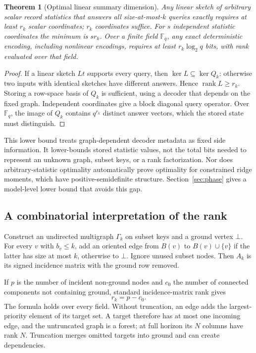 \documentclass[11pt,a4paper]{article}
\newtheorem{theorem}{Theorem}[section]
\theoremstyle{definition}\newtheorem{definition}[theorem]{Definition}
\begin{document}
\begin{theorem}[Optimal linear summary dimension]\label{thm:rank}
Any linear sketch of arbitrary scalar record statistics that answers all size-at-most-$k$ queries exactly requires at least $r_k$ scalar coordinates; $r_k$ coordinates suffice. For $s$ independent statistic coordinates the minimum is $sr_k$. Over a finite field $\mathbb F_q$, any exact deterministic encoding, including nonlinear encodings, requires at least $r_k\log_2q$ bits, with rank evaluated over that field.
\end{theorem}
\begin{proof}
If a linear sketch $Lt$ supports every query, then $\ker L\subseteq\ker Q_k$: otherwise two inputs with identical sketches have different answers. Hence $\operatorname{rank}L\ge r_k$. Storing a row-space basis of $Q_k$ is sufficient, using a decoder that depends on the fixed graph. Independent coordinates give a block diagonal query operator. Over $\mathbb F_q$, the image of $Q_k$ contains $q^{r_k}$ distinct answer vectors, which the stored state must distinguish.
\end{proof}

This lower bound treats graph-dependent decoder metadata as fixed side information. It lower-bounds stored statistic values, not the total bits needed to represent an unknown graph, subset keys, or a rank factorization. Nor does arbitrary-statistic optimality automatically prove optimality for constrained ridge moments, which have positive-semidefinite structure. Section~\ref{sec:phase} gives a model-level lower bound that avoids this gap.

\subsection{A combinatorial interpretation of the rank}
Construct an undirected multigraph $\Gamma_k$ on subset keys and a ground vertex $\bot$. For every $v$ with $b_v\le k$, add an oriented edge from $B(v)$ to $B(v)\cup\{v\}$ if the latter has size at most $k$, otherwise to $\bot$. Ignore unused subset nodes. Then $A_k$ is its signed incidence matrix with the ground row removed.

If $p$ is the number of incident non-ground nodes and $c_0$ the number of connected components not containing ground, standard incidence-matrix rank gives
\begin{equation}
 r_k=p-c_0.
\end{equation}
The formula holds over every field. Without truncation, an edge adds the largest-priority element of its target set. A target therefore has at most one incoming edge, and the untruncated graph is a forest; at full horizon its $N$ columns have rank $N$. Truncation merges omitted targets into ground and can create dependencies.
\end{document}
